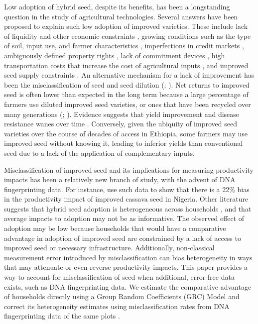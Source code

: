 \documentclass[11pt]{article}
\begin{document}

Low adoption of hybrid seed, despite its benefits, has been a longstanding question in the study of agricultural technologies. Several answers have been proposed to explain such low adoption of improved varieties. These include lack of liquidity and other economic constraints \citep{Carter2014-fm}, growing conditions such as the type of soil, input use, and farmer characteristics \citep{Munshi2004-og}, imperfections in credit markets \citep{Croppenstedt2003-pq}, ambiguously defined property rights \citep{Place2000-el}, lack of commitment devices \citep{Duflo2009-iv}, high transportation costs that increase the cost of agricultural inputs \citep{Byerlee2013-qk}, and improved seed supply constraints \citep{Bird2020-nt}. An alternative mechanism for a lack of improvement has been the misclassification of seed and seed dilution (\citealt{wossen2022misperceiving}; \citealt{kosmowski2019varietal}). Net returns to improved seed is often lower than expected in the long term because a large percentage of farmers use diluted improved seed varieties, or ones that have been recycled over many generations (\citealt{euler2022because}; \citealt{wossen2019estimating}). Evidence suggests that yield improvement and disease resistance wanes over time \citep{Abate2015-rj}. Conversely, given the ubiquity of improved seed varieties over the course of decades of access in Ethiopia, some farmers may use improved seed without knowing it, leading to inferior yields than conventional seed due to a lack of the application of complementary inputs. 



Misclassification of improved seed and its implications for measuring productivity impacts has been a relatively new branch of study, with the advent of DNA fingerprinting data. For instance, \cite{wossen2019estimating} use such data to show that there is a 22\% bias in the productivity impact of improved cassava seed in Nigeria. Other literature suggests that hybrid seed adoption is heterogeneous across households \citep{Suri2011-oi}, and that average impacts to adoption may not be as informative. The observed effect of adoption may be low because households that would have a comparative advantage in adoption of improved seed are constrained by a lack of access to improved seed or necessary infrastructure. Additionally, non-classical measurement error introduced by misclassification can bias heterogeneity in ways that may attenuate or even reverse productivity impacts. This paper provides a way to account for misclassification of seed when additional, error-free data exists, such as DNA fingerprinting data. We estimate the comparative advantage of households directly using a Group Random Coefficients (GRC) Model and correct its heterogeneity estimates using misclassification rates from DNA fingerprinting data of the same plots \citep{Suri2011-oi, Tjernstrom_Emilia_Dalia_Ghanem_Oscar_Barriga_Cabanillas_Travis_J_Lybbert_Jeffrey_D_Michler_and_Aleksandr_Michuda2020-bc}. 
\end{document}
